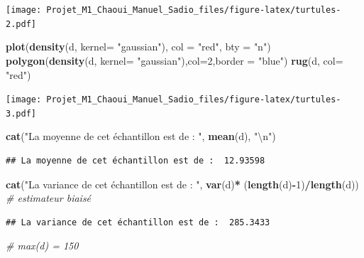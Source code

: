 \documentclass[
]{book}
\newenvironment{Shaded}{\begin{snugshade}}{\end{snugshade}}
\newcommand{\CharTok}[1]{\textcolor[rgb]{0.31,0.60,0.02}{#1}}
\newcommand{\CommentTok}[1]{\textcolor[rgb]{0.56,0.35,0.01}{\textit{#1}}}
\newcommand{\DataTypeTok}[1]{\textcolor[rgb]{0.13,0.29,0.53}{#1}}
\newcommand{\DecValTok}[1]{\textcolor[rgb]{0.00,0.00,0.81}{#1}}
\newcommand{\KeywordTok}[1]{\textcolor[rgb]{0.13,0.29,0.53}{\textbf{#1}}}
\newcommand{\NormalTok}[1]{#1}
\newcommand{\OperatorTok}[1]{\textcolor[rgb]{0.81,0.36,0.00}{\textbf{#1}}}
\newcommand{\StringTok}[1]{\textcolor[rgb]{0.31,0.60,0.02}{#1}}
\begin{document}
\texttt{[image: Projet\_M1\_Chaoui\_Manuel\_Sadio\_files/figure-latex/turtules-2.pdf]}

\begin{Shaded}
\begin{Highlighting}[]
\KeywordTok{plot}\NormalTok{(}\KeywordTok{density}\NormalTok{(d, }\DataTypeTok{kernel=} \StringTok{"gaussian"}\NormalTok{), }\DataTypeTok{col =} \StringTok{"red"}\NormalTok{, }\DataTypeTok{bty =} \StringTok{"n"}\NormalTok{)}
\KeywordTok{polygon}\NormalTok{(}\KeywordTok{density}\NormalTok{(d, }\DataTypeTok{kernel=} \StringTok{"gaussian"}\NormalTok{),}\DataTypeTok{col=}\DecValTok{2}\NormalTok{,}\DataTypeTok{border =} \StringTok{"blue"}\NormalTok{)}
\KeywordTok{rug}\NormalTok{(d, }\DataTypeTok{col=} \StringTok{"red"}\NormalTok{)}
\end{Highlighting}
\end{Shaded}

\texttt{[image: Projet\_M1\_Chaoui\_Manuel\_Sadio\_files/figure-latex/turtules-3.pdf]}

\begin{Shaded}
\begin{Highlighting}[]
\KeywordTok{cat}\NormalTok{(}\StringTok{"La moyenne de cet échantillon est de : "}\NormalTok{, }\KeywordTok{mean}\NormalTok{(d), }\StringTok{"}\CharTok{\textbackslash{}n}\StringTok{"}\NormalTok{)}
\end{Highlighting}
\end{Shaded}

\begin{verbatim}
## La moyenne de cet échantillon est de :  12.93598
\end{verbatim}

\begin{Shaded}
\begin{Highlighting}[]
\KeywordTok{cat}\NormalTok{(}\StringTok{"La variance de cet échantillon est de : "}\NormalTok{, }\KeywordTok{var}\NormalTok{(d)}\OperatorTok{*}\StringTok{ }\NormalTok{(}\KeywordTok{length}\NormalTok{(d)}\OperatorTok{-}\DecValTok{1}\NormalTok{)}\OperatorTok{/}\KeywordTok{length}\NormalTok{(d)) }\CommentTok{# estimateur biaisé}
\end{Highlighting}
\end{Shaded}

\begin{verbatim}
## La variance de cet échantillon est de :  285.3433
\end{verbatim}

\begin{Shaded}
\begin{Highlighting}[]
\CommentTok{# max(d) = 150}
\end{Highlighting}
\end{Shaded}
\end{document}
